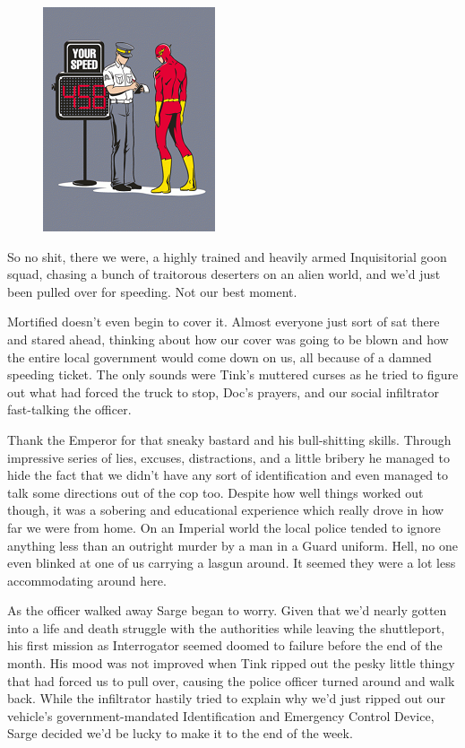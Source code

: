 \begin{figure}
	\begin{center}
		\includegraphics[width=\figwidth]{pics/10/14.png}
	\end{center}
\end{figure}
So no shit, there we were, a highly trained and heavily armed Inquisitorial goon squad, chasing a bunch of traitorous deserters on an alien world, and we'd just been pulled over for speeding. 
Not our best moment.

Mortified doesn't even begin to cover it. 
Almost everyone just sort of sat there and stared ahead, thinking about how our cover was going to be blown and how the entire local government would come down on us, all because of a damned speeding ticket. 
The only sounds were Tink's muttered curses as he tried to figure out what had forced the truck to stop, Doc's prayers, and our social infiltrator fast-talking the officer. 


Thank the Emperor for that sneaky bastard and his bull-shitting skills. 
Through impressive series of lies, excuses, distractions, and a little bribery he managed to hide the fact that we didn't have any sort of identification and even managed to talk some directions out of the cop too. 
Despite how well things worked out though, it was a sobering and educational experience which really drove in how far we were from home. 
On an Imperial world the local police tended to ignore anything less than an outright murder by a man in a Guard uniform. 
Hell, no one even blinked at one of us carrying a lasgun around. 
It seemed they were a lot less accommodating around here.

As the officer walked away Sarge began to worry. 
Given that we'd nearly gotten into a life and death struggle with the authorities while leaving the shuttleport, his first mission as Interrogator seemed doomed to failure before the end of the month. 
His mood was not improved when Tink ripped out the pesky little thingy that had forced us to pull over, causing the police officer turned around and walk back. 
While the infiltrator hastily tried to explain why we'd just ripped out our vehicle's government-mandated Identification and Emergency Control Device, Sarge decided we'd be lucky to make it to the end of the week.


